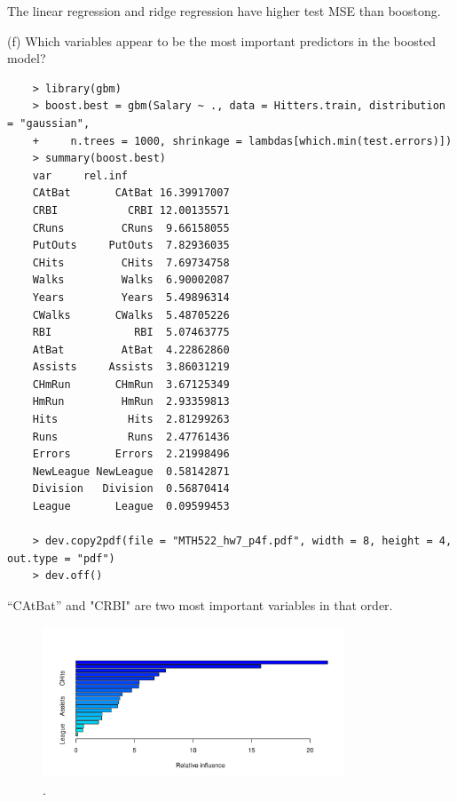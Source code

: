 \documentclass{article}
\begin{document}
The linear regression and ridge regression have higher test MSE than boostong.


\newpage


(f) Which variables appear to be the most important predictors in the boosted model? \\

\begin{program}
	\begin{verbatim}
	> library(gbm)
	> boost.best = gbm(Salary ~ ., data = Hitters.train, distribution = "gaussian",
	+     n.trees = 1000, shrinkage = lambdas[which.min(test.errors)])
	> summary(boost.best)
	var     rel.inf
	CAtBat       CAtBat 16.39917007
	CRBI           CRBI 12.00135571
	CRuns         CRuns  9.66158055
	PutOuts     PutOuts  7.82936035
	CHits         CHits  7.69734758
	Walks         Walks  6.90002087
	Years         Years  5.49896314
	CWalks       CWalks  5.48705226
	RBI             RBI  5.07463775
	AtBat         AtBat  4.22862860
	Assists     Assists  3.86031219
	CHmRun       CHmRun  3.67125349
	HmRun         HmRun  2.93359813
	Hits           Hits  2.81299263
	Runs           Runs  2.47761436
	Errors       Errors  2.21998496
	NewLeague NewLeague  0.58142871
	Division   Division  0.56870414
	League       League  0.09599453

	> dev.copy2pdf(file = "MTH522_hw7_p4f.pdf", width = 8, height = 4, out.type = "pdf")
	> dev.off()
		\end{verbatim}
\end{program}

“CAtBat”  and "CRBI" are two most important variables in that order.

\begin{figure}[htb]
	\begin{center}
		\includegraphics[width=0.8\textwidth]{MTH522_hw7_p4f.pdf}
	\end{center}
	\caption{.}
	\label{fig:MTH522_hw7_p4f}
\end{figure}


\newpage
\end{document}
